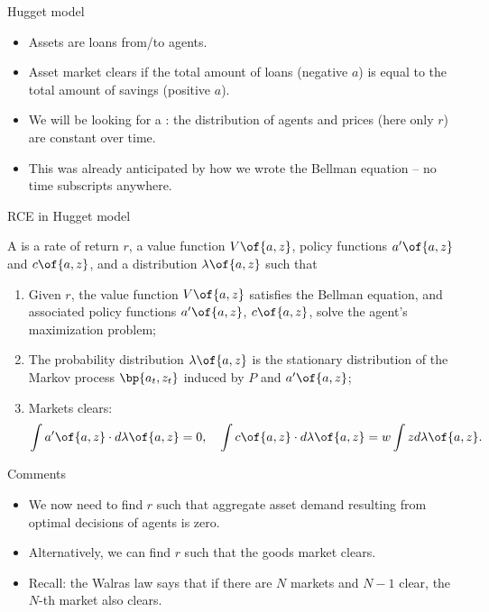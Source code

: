 \documentclass[11pt,xcolor={dvipsnames},aspectratio=159,hyperref={pdftex,pdfpagemode=UseNone,hidelinks,pdfdisplaydoctitle=true},usepdftitle=false]{beamer}
\begin{document}
    \begin{frame}{Hugget model}
        \begin{itemize}
            \item Assets are loans from/to agents.
            \item Asset market clears if the total amount of loans (negative $a$) is equal to the total amount of savings (positive $a$).
            \item We will be looking for a : the distribution of agents and prices (here only $r$) are constant over time.
            \item This was already anticipated by how we wrote the Bellman equation -- no time subscripts anywhere.
        \end{itemize}
        \end{frame}

    \begin{frame}{RCE in Hugget model}
        \begin{definition}

            A  is a rate of return $r$, a value function $V\of{a,z}$, policy functions $a^\prime\of{a,z}$ and $c\of{a,z}$, and a distribution $\lambda\of{a,z}$ such that \begin{enumerate}
                \item Given $r$, the value function $V\of{a,z}$ satisfies the Bellman equation, and associated policy functions $a^\prime\of{a,z}$, $c\of{a,z}$, solve the agent's maximization problem;
                \item The probability distribution $\lambda\of{a,z}$ is the stationary distribution of the Markov process $\bp{a_t,z_t}$ induced by $P$ and $a^\prime\of{a,z}$;
                \item Markets clears: \begin{align*}
                    \int  a^\prime\of{a,z} \cdot d\lambda\of{a,z} =0, \quad
            \int  c\of{a,z} \cdot d\lambda\of{a,z} = w\int z d\lambda\of{a,z}. \end{align*}
            \end{enumerate}
            \end{definition}
        \end{frame}

\begin{frame}{Comments}   
    \begin{itemize}
        \item We now need to find $r$ such that aggregate asset demand resulting from optimal decisions of agents is zero.
        \item Alternatively, we can find $r$ such that the goods market clears. 
        \item Recall: the Walras law says that if there are $N$ markets and $N-1$ clear, the $N$-th market also clears.
    \end{itemize}
    \end{frame}
\end{document}
